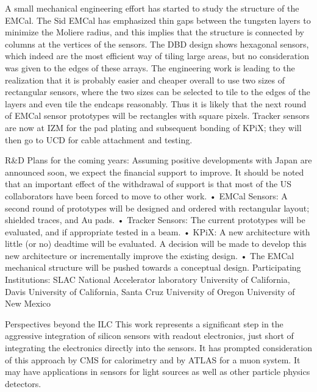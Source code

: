 \documentclass[11pt]{article}
\begin{document}
A small mechanical engineering effort has started to study the structure of the EMCal. The Sid EMCal has emphasized thin gaps between the tungsten layers to minimize the Moliere radius, and this implies that the structure is connected by columns at the vertices of the sensors. The DBD design shows hexagonal sensors, which indeed are the most efficient way of tiling large areas, but no consideration was given to the edges of these arrays. The engineering work is leading to the realization that it is probably easier and cheaper overall to use two sizes of rectangular sensors, where the two sizes can be selected to tile to the edges of the layers and even tile the endcaps reasonably. Thus it is likely that the next round of EMCal sensor prototypes will be rectangles with square pixels.
Tracker sensors are now at IZM for the pad plating and subsequent bonding of KPiX; they will then go to UCD for cable attachment and testing.

R&D Plans for the coming years:
Assuming positive developments with Japan are announced soon, we expect the financial support to improve. It should be noted that an important effect of the withdrawal of support is that most of the US collaborators have been forced to move to other work. 
•	EMCal Sensors: A second round of prototypes will be designed and ordered with rectangular layout; shielded traces, and Au pads.
•	Tracker Sensors: The current prototypes will be evaluated, and if appropriate tested in a beam.
•	KPiX: A new architecture with little (or no) deadtime will be evaluated. A decision will be made to develop this new architecture or incrementally improve the existing design.
•	The EMCal mechanical structure will be pushed towards a conceptual design.
Participating Institutions:
	SLAC National Accelerator laboratory
University of California, Davis
University of California, Santa Cruz
University of Oregon
University of New Mexico


Perspectives beyond the ILC
	This work represents a significant step in the aggressive integration of silicon sensors with readout electronics, just short of integrating the electronics directly into the sensors. It has prompted consideration of this approach by CMS for calorimetry and by ATLAS for a muon system.  It may have applications in sensors for light sources as well as other particle physics detectors.
\end{document}
